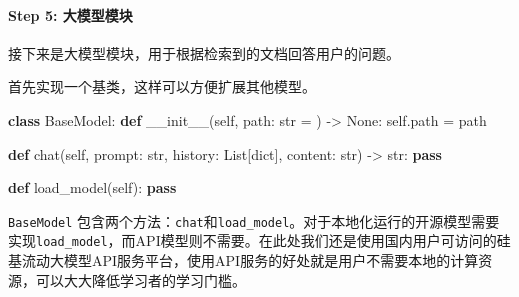 \documentclass[
]{article}
\newenvironment{Shaded}{}{}
\newcommand{\BuiltInTok}[1]{\textcolor[rgb]{0.00,0.50,0.00}{#1}}
\newcommand{\ControlFlowTok}[1]{\textcolor[rgb]{0.00,0.44,0.13}{\textbf{#1}}}
\newcommand{\FunctionTok}[1]{\textcolor[rgb]{0.02,0.16,0.49}{#1}}
\newcommand{\KeywordTok}[1]{\textcolor[rgb]{0.00,0.44,0.13}{\textbf{#1}}}
\newcommand{\NormalTok}[1]{#1}
\newcommand{\OperatorTok}[1]{\textcolor[rgb]{0.40,0.40,0.40}{#1}}
\newcommand{\StringTok}[1]{\textcolor[rgb]{0.25,0.44,0.63}{#1}}
\newcommand{\VariableTok}[1]{\textcolor[rgb]{0.10,0.09,0.49}{#1}}
\begin{document}
\paragraph{Step 5:
大模型模块}\label{step-5-ux5927ux6a21ux578bux6a21ux5757}

接下来是大模型模块，用于根据检索到的文档回答用户的问题。

首先实现一个基类，这样可以方便扩展其他模型。

\begin{Shaded}
\begin{Highlighting}[]
\KeywordTok{class}\NormalTok{ BaseModel:}
    \KeywordTok{def} \FunctionTok{\_\_init\_\_}\NormalTok{(}\VariableTok{self}\NormalTok{, path: }\BuiltInTok{str} \OperatorTok{=} \StringTok{\textquotesingle{}\textquotesingle{}}\NormalTok{) }\OperatorTok{{-}\textgreater{}} \VariableTok{None}\NormalTok{:}
        \VariableTok{self}\NormalTok{.path }\OperatorTok{=}\NormalTok{ path}

    \KeywordTok{def}\NormalTok{ chat(}\VariableTok{self}\NormalTok{, prompt: }\BuiltInTok{str}\NormalTok{, history: List[}\BuiltInTok{dict}\NormalTok{], content: }\BuiltInTok{str}\NormalTok{) }\OperatorTok{{-}\textgreater{}} \BuiltInTok{str}\NormalTok{:}
        \ControlFlowTok{pass}

    \KeywordTok{def}\NormalTok{ load\_model(}\VariableTok{self}\NormalTok{):}
        \ControlFlowTok{pass}
\end{Highlighting}
\end{Shaded}

\texttt{BaseModel}
包含两个方法：\texttt{chat}和\texttt{load\_model}。对于本地化运行的开源模型需要实现\texttt{load\_model}，而API模型则不需要。在此处我们还是使用国内用户可访问的硅基流动大模型API服务平台，使用API服务的好处就是用户不需要本地的计算资源，可以大大降低学习者的学习门槛。
\end{document}
